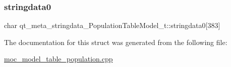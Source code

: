 \subsubsection{\texorpdfstring{stringdata0}{stringdata0}}
{\footnotesize\ttfamily char qt\+\_\+meta\+\_\+stringdata\+\_\+\+Population\+Table\+Model\+\_\+t\+::stringdata0\mbox{[}383\mbox{]}}



The documentation for this struct was generated from the following file\+:\begin{DoxyCompactItemize}
\item 
\hyperlink{moc__model__table__population_8cpp}{moc\+\_\+model\+\_\+table\+\_\+population.\+cpp}\end{DoxyCompactItemize}
